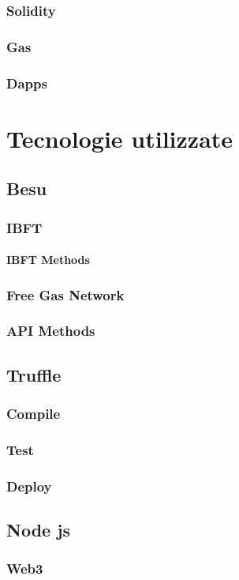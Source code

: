 \documentclass[a4paper]{report}
\begin{document}
\subsection{Solidity}
\subsection{Gas}
\subsection{Dapps}

\chapter{Tecnologie utilizzate}
\section{Besu}
\subsection{IBFT}
\subsubsection{IBFT Methods}
\subsection{Free Gas Network}
\subsection{API Methods}
\section{Truffle}
\subsection{Compile}
\subsection{Test}
\subsection{Deploy}
\section{Node js}
\subsection{Web3}
\end{document}
